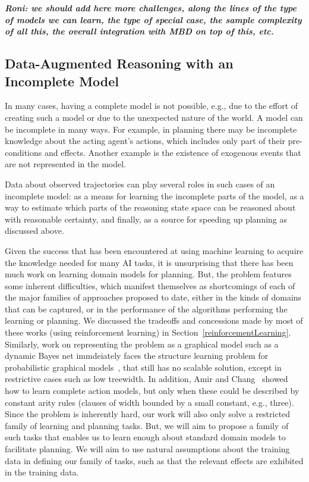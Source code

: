 \documentclass[12pt]{article}
\newcommand{\note}[1]{\textbf{\textit{#1}}}
\begin{document}
\note{Roni: we should add here more challenges, along the lines of the type of models we can learn, the type of special case, the sample complexity of all this, the overall integration with MBD on top of this, etc.}




\subsection{Data-Augmented Reasoning with an Incomplete Model}

In many cases, having a complete model is not possible, e.g., due to the effort of creating such a model or due to the unexpected nature of the world. A model can be incomplete in many ways. For example, in planning there may be incomplete knowledge about the acting agent's actions, which includes only part of their pre-conditions and effects. Another example is the existence of exogenous events that are not represented in the model. 

Data about observed trajectories can play several roles in such cases of an incomplete model: as a means for learning the incomplete parts of the model, as a way to estimate which parts of the reasoning state space can be reasoned about with reasonable certainty, 
and finally, as a source for speeding up planning as discussed above. 

Given the success that has been encountered at using machine learning to acquire the knowledge needed for many AI tasks, it is unsurprising that there has been much work on learning domain models for planning. But, the problem features some inherent difficulties, which manifest themselves as shortcomings of each of the major families of approaches proposed to date, either in the kinds of domains that can be captured, or in the performance of the algorithms performing the learning or planning. We discussed the tradeoffs and concessions made by most of these works (using reinforcement learning) in Section~\ref{reinforcementLearning}. Similarly, work on representing the problem as a graphical model such as a dynamic Bayes net immdeiately faces the structure learning problem for probabilistic graphical models~\cite[Section~19.4]{koller2009pgm}, that still has no scalable solution, except in restrictive cases such as low treewidth. In addition, Amir and Chang~\cite{amir2008} showed how to learn complete action models, but only when these could be described by constant arity rules (clauses of width bounded by a small constant, e.g., three). Since the problem is inherently hard, our work will also only solve a restricted family of learning and planning tasks. But, we will aim to propose a family of such tasks that enables us to learn enough about standard domain models to facilitate planning. We will aim to use natural assumptions about the training data in defining our family of tasks, such as that the relevant effects are exhibited in the training data.
\end{document}
